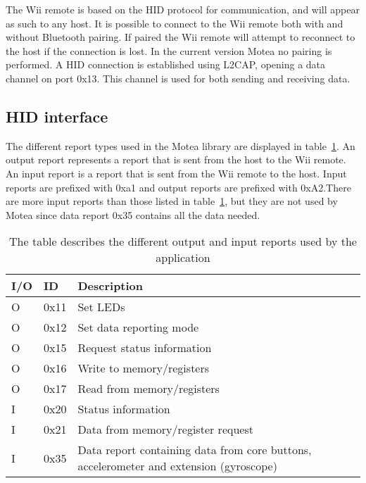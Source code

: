 The Wii remote is based on the HID protocol for communication, and will appear as such to any host. It is possible to connect to the Wii remote both with and without Bluetooth pairing. If paired the Wii remote will attempt to reconnect to the host if the connection is lost. In the current version Motea no pairing is performed. A HID connection is established using L2CAP, opening a data channel on port 0x13. This channel is used for both sending and receiving data.

\subsection{HID interface}
The different report types used in the Motea library are displayed in table~\ref{tab:hidInterface}. An output report represents a report that is sent from the host to the Wii remote. An input report is a report that is sent from the Wii remote to the host. Input reports are prefixed with 0xa1 and output reports are prefixed with 0xA2.There are more input reports than those listed in table~\ref{tab:hidInterface}, but they are not used by Motea since data report 0x35 contains all the data needed. 

\begin{table}[h!]
\centering
\begin{tabularx}{\textwidth}{|l|l|X|}
\hline
I/O & ID & Description \\ \hline
O & 0x11 & Set LEDs \\ \hline
O & 0x12 & Set data reporting mode \\ \hline
O & 0x15 & Request status information \\ \hline
O & 0x16 & Write to memory/registers \\ \hline
O & 0x17 & Read from memory/registers \\ \hline
I & 0x20 & Status information \\ \hline
I & 0x21 & Data from memory/register request \\ \hline
I & 0x35 & Data report containing data from core buttons, accelerometer and extension (gyroscope) \\ \hline
\end{tabularx}
\caption{\footnotesize The table describes the different output and input reports used by the application}
\label{tab:hidInterface}
\end{table}

